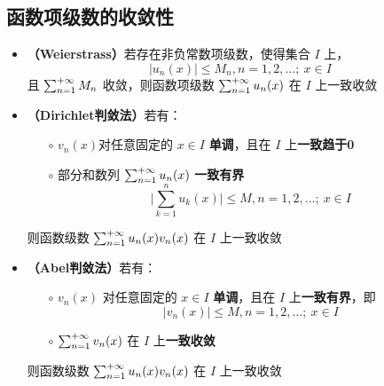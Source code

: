 \documentclass[./main.tex]{subfiles}
\begin{document}
\subsection{函数项级数的收敛性}
\begin{itemize}
  \item \textbf{（Weierstrass）}若存在非负常数项级数，使得集合 $I$ 上，$$|u_n(x)|\le M_n,n=1,2,\dots;\ x\in I$$
  且 $\sum_{n=1}^{+\infty}M_n$ 收敛，则函数项级数 $\sum_{n=1}^{+\infty}u_n(x)$ 在 $I$ 上一致收敛
  \item \textbf{（Dirichlet判敛法）}若有：
  \begin{itemize}
    \item[$\circ$] $v_n(x)$对任意固定的 $x\in I$ \textbf{单调}，且在 $I$ 上\textbf{一致趋于0}
    \item[$\circ$] 部分和数列 $\sum_{n=1}^{+\infty}u_n(x)$ \textbf{一致有界} $$\bigg|\sum_{k=1}^nu_k(x)\bigg|\le M,n=1,2,\dots;\ x\in I$$ 
  \end{itemize}
  则函数级数 $\sum_{n=1}^{+\infty}u_n(x)v_n(x)$ 在 $I$ 上一致收敛
  \item \textbf{（Abel判敛法）}若有：
  \begin{itemize}
    \item[$\circ$] $v_n(x)$ 对任意固定的 $x\in I$ \textbf{单调}，且在 $I$ 上\textbf{一致有界}，即 $$|v_n(x)|\le M,n=1,2,\dots;\ x\in I$$ 
    \item[$\circ$] $\sum_{n=1}^{+\infty}v_n(x)$ 在 $I$ 上\textbf{一致收敛}
  \end{itemize}
  则函数级数 $\sum_{n=1}^{+\infty}u_n(x)v_n(x)$ 在 $I$ 上一致收敛
\end{itemize}
\end{document}
